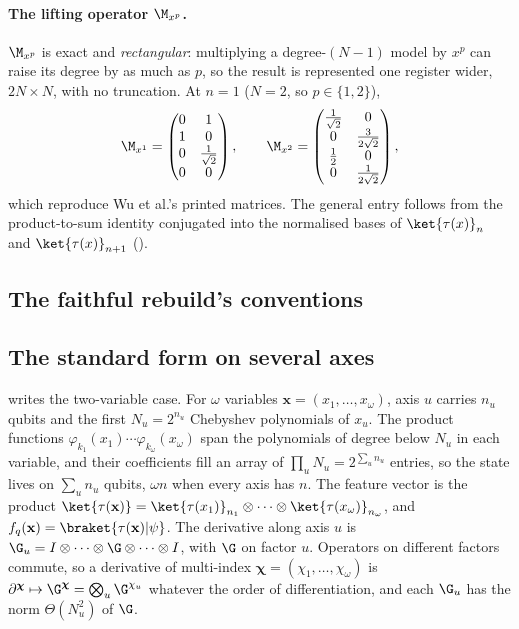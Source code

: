 \paragraph{The lifting operator $\M_{x^p}$.} $\M_{x^p}$ is exact and
\emph{rectangular}: multiplying a degree-$(N{-}1)$ model by $x^p$ can raise its
degree by as much as $p$, so the result is represented one register wider,
$2N \times N$, with no truncation. At $n=1$ ($N=2$, so $p \in \{1,2\}$),
\begin{equation}
    \M_{x^1} =
    \begin{pmatrix}
        0 & 1 \\
        1 & 0 \\
        0 & \tfrac{1}{\sqrt2} \\
        0 & 0
    \end{pmatrix},
    \qquad
    \M_{x^2} =
    \begin{pmatrix}
        \tfrac{1}{\sqrt2} & 0 \\
        0 & \tfrac{3}{2\sqrt2} \\
        \tfrac{1}{2} & 0 \\
        0 & \tfrac{1}{2\sqrt2}
    \end{pmatrix},
    \label{eq:app-Mxp-example}
\end{equation}
which reproduce Wu et al.'s printed matrices. The general entry follows from the product-to-sum identity conjugated into the normalised bases of $\ket{\tau(x)}_n$ and $\ket{\tau(x)}_{n+1}$ ().
\subsection{The faithful rebuild's conventions}
\label{app:faithful-conventions}

\subsection{The standard form on several axes}
\label{app:pihm-multi-axis}
 writes the two-variable case. For $\omega$ variables $\mathbf x=(x_1,\dots,x_\omega)$, axis $u$ carries $n_u$ qubits and the first $N_u=2^{n_u}$ Chebyshev polynomials of $x_u$. The product functions $\varphi_{k_1}(x_1)\cdots\varphi_{k_\omega}(x_\omega)$ span the polynomials of degree below $N_u$ in each variable, and their coefficients fill an array of $\prod_uN_u=2^{\sum_un_u}$ entries, so the state lives on $\sum_un_u$ qubits, $\omega n$ when every axis has $n$. The feature vector is the product $\ket{\tau(\mathbf x)}=\ket{\tau(x_1)}_{n_1}\otimes\dots\otimes\ket{\tau(x_\omega)}_{n_\omega}$, and $f_q(\mathbf x)=\braket{\tau(\mathbf x)|\psi}$. The derivative along axis $u$ is $\G_u=I\otimes\dots\otimes\G\otimes\dots\otimes I$, with $\G$ on factor $u$. Operators on different factors commute, so a derivative of multi-index $\boldsymbol\chi=(\chi_1,\dots,\chi_\omega)$ is $\partial^{\boldsymbol\chi}\mapsto\G^{\boldsymbol\chi}=\bigotimes_u\G^{\chi_u}$ whatever the order of differentiation, and each $\G_u$ has the norm $\Theta(N_u^2)$ of $\G$.

